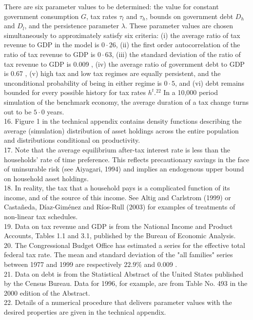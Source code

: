 \documentclass[11pt]{article}
\begin{document}
There are six parameter values to be determined: the value for constant government consumption $G$, tax rates $\tau_{l}$ and $\tau_{h}$, bounds on government debt $D_{h}$ and $D_{l}$, and the persistence parameter $\lambda$. These parameter values are chosen simultaneously to approximately satisfy six criteria: (i) the average ratio of tax revenue to GDP in the model is $0 \cdot 26$, (ii) the first order autocorrelation of the ratio of tax revenue to GDP is $0 \cdot 63$, (iii) the standard deviation of the ratio of tax revenue to GDP is 0.009 , (iv) the average ratio of government debt to GDP is 0.67 , (v) high tax and low tax regimes are equally persistent, and the unconditional probability of being in either regime is $0 \cdot 5$, and (vi) debt remains bounded for every possible history for tax rates $h^{t} .{ }^{22}$ In a 10,000 period simulation of the benchmark economy, the average duration of a tax change turns out to be $5 \cdot 0$ years.\\
16. Figure 1 in the technical appendix contains density functions describing the average (simulation) distribution of asset holdings across the entire population and distributions conditional on productivity.\\
17. Note that the average equilibrium after-tax interest rate is less than the households' rate of time preference. This reflects precautionary savings in the face of uninsurable risk (see Aiyagari, 1994) and implies an endogenous upper bound on household asset holdings.\\
18. In reality, the tax that a household pays is a complicated function of its income, and of the source of this income. See Altig and Carlstrom (1999) or Castañeda, Díaz-Giménez and Ríos-Rull (2003) for examples of treatments of non-linear tax schedules.\\
19. Data on tax revenue and GDP is from the National Income and Product Accounts, Tables 1.1 and 3.1, published by the Bureau of Economic Analysis.\\
20. The Congressional Budget Office has estimated a series for the effective total federal tax rate. The mean and standard deviation of the "all families" series between 1977 and 1999 are respectively $22.9 \%$ and 0.009 .\\
21. Data on debt is from the Statistical Abstract of the United States published by the Census Bureau. Data for 1996, for example, are from Table No. 493 in the 2000 edition of the Abstract.\\
22. Details of a numerical procedure that delivers parameter values with the desired properties are given in the technical appendix.
\end{document}
